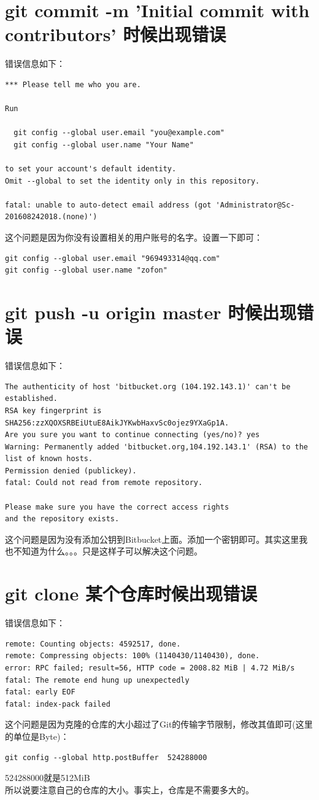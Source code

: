 \documentclass[a4paper,12pt]{ctexart}
\begin{document}
\section{git commit -m 'Initial commit with contributors' 时候出现错误}
错误信息如下：
\begin{verbatim}
*** Please tell me who you are.

Run

  git config --global user.email "you@example.com"
  git config --global user.name "Your Name"

to set your account's default identity.
Omit --global to set the identity only in this repository.

fatal: unable to auto-detect email address (got 'Administrator@Sc-201608242018.(none)')
\end{verbatim}
这个问题是因为你没有设置相关的用户账号的名字。设置一下即可：
\begin{verbatim}
git config --global user.email "969493314@qq.com"
git config --global user.name "zofon"
\end{verbatim}

\section{git push -u origin master 时候出现错误}
错误信息如下：
\begin{verbatim}
The authenticity of host 'bitbucket.org (104.192.143.1)' can't be established.
RSA key fingerprint is SHA256:zzXQOXSRBEiUtuE8AikJYKwbHaxvSc0ojez9YXaGp1A.
Are you sure you want to continue connecting (yes/no)? yes
Warning: Permanently added 'bitbucket.org,104.192.143.1' (RSA) to the list of known hosts.
Permission denied (publickey).
fatal: Could not read from remote repository.

Please make sure you have the correct access rights
and the repository exists.
\end{verbatim}
这个问题是因为没有添加公钥到Bitbucket上面。添加一个密钥即可。其实这里我也不知道为什么。。。只是这样子可以解决这个问题。

\section{git clone 某个仓库时候出现错误}
错误信息如下：
\begin{verbatim}
remote: Counting objects: 4592517, done.
remote: Compressing objects: 100% (1140430/1140430), done.
error: RPC failed; result=56, HTTP code = 2008.82 MiB | 4.72 MiB/s
fatal: The remote end hung up unexpectedly
fatal: early EOF
fatal: index-pack failed
\end{verbatim}
这个问题是因为克隆的仓库的大小超过了Git的传输字节限制，修改其值即可(这里的单位是Byte)：\\
\begin{verbatim}
git config --global http.postBuffer  524288000
\end{verbatim}
524288000就是512MiB\\
所以说要注意自己的仓库的大小。事实上，仓库是不需要多大的。
\end{document}
